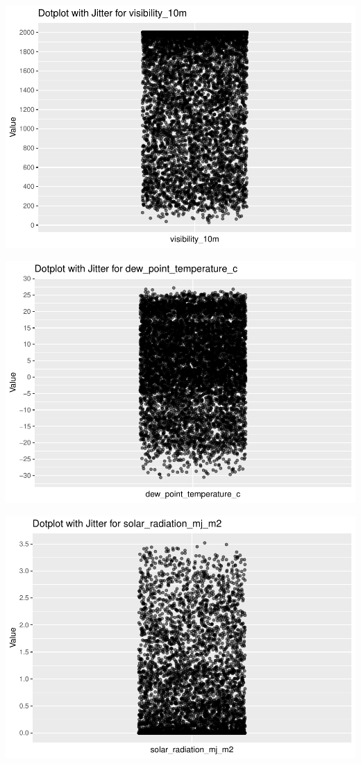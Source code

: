 \documentclass[
  11pt,
  letterpaper,
]{article}
\begin{document}
\begin{center}\includegraphics[width=1.2\linewidth,]{Final_Project_files/figure-latex/unnamed-chunk-13-5} \end{center}

\begin{center}\includegraphics[width=1.2\linewidth,]{Final_Project_files/figure-latex/unnamed-chunk-13-6} \end{center}

\begin{center}\includegraphics[width=1.2\linewidth,]{Final_Project_files/figure-latex/unnamed-chunk-13-7} \end{center}
\end{document}
